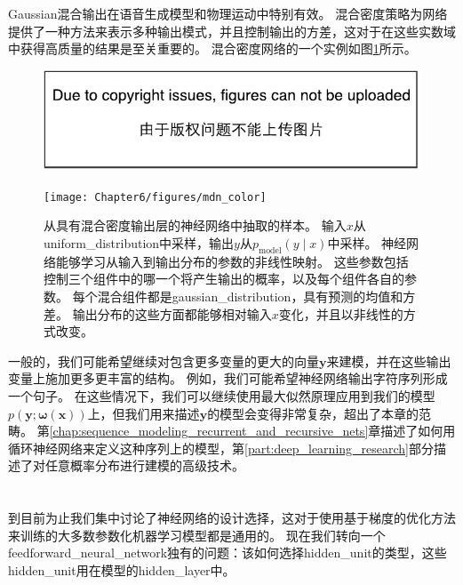 
Gaussian混合输出在语音生成模型\citep{schuster1999supervised}和物理运动\citep{Graves-arxiv2013}中特别有效。
混合密度策略为网络提供了一种方法来表示多种输出模式，并且控制输出的方差，这对于在这些实数域中获得高质量的结果是至关重要的。
混合密度网络的一个实例如图\ref{fig:chap6_mdn_color}所示。
\begin{figure}[!htb]
\ifOpenSource
\centerline{\includegraphics{figure.pdf}}
\else
\centerline{\texttt{[image: Chapter6/figures/mdn\_color]}}
\fi
\captionsetup{singlelinecheck=off}
\caption{从具有混合密度输出层的神经网络中抽取的样本。
输入$x$从\gls{uniform_distribution}中采样，输出$y$从$p_{\text{model}}(y\mid x)$中采样。 神经网络能够学习从输入到输出分布的参数的非线性映射。 这些参数包括控制三个组件中的哪一个将产生输出的概率，以及每个组件各自的参数。
每个混合组件都是\gls{gaussian_distribution}，具有预测的均值和方差。 输出分布的这些方面都能够相对输入$x$变化，并且以非线性的方式改变。}
\label{fig:chap6_mdn_color}
\end{figure}


一般的，我们可能希望继续对包含更多变量的更大的向量$\bm{y}$来建模，并在这些输出变量上施加更多更丰富的结构。
例如，我们可能希望神经网络输出字符序列形成一个句子。
在这些情况下，我们可以继续使用最大似然原理应用到我们的模型$p(\bm{y};\bm{\omega}(\bm{x}))$上，但我们用来描述$\bm{y}$的模型会变得非常复杂，超出了本章的范畴。
第\ref{chap:sequence_modeling_recurrent_and_recursive_nets}章描述了如何用循环神经网络来定义这种序列上的模型，第\ref{part:deep_learning_research}部分描述了对任意概率分布进行建模的高级技术。

\section{}
\label{sec:hidden_units}

到目前为止我们集中讨论了神经网络的设计选择，这对于使用基于梯度的优化方法来训练的大多数参数化机器学习模型都是通用的。
现在我们转向一个\gls{feedforward_neural_network}独有的问题：该如何选择\gls{hidden_unit}的类型，这些\gls{hidden_unit}用在模型的\gls{hidden_layer}中。

